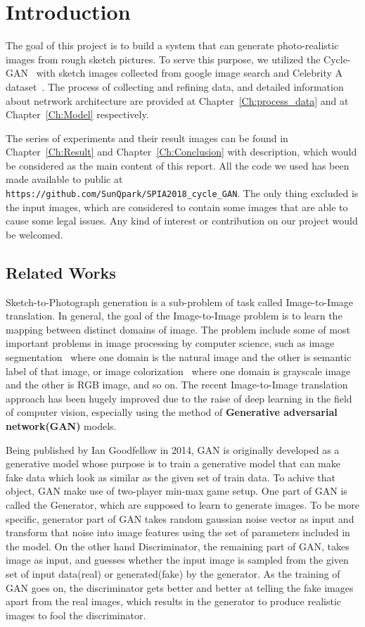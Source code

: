\chapter{Introduction}\label{Ch:Introduction}

The goal of this project is to build a system that can generate photo-realistic images from rough sketch pictures. To serve this purpose, we utilized the Cycle-GAN~\cite{CycleGAN} with sketch images collected from google image search and Celebrity A dataset~\cite{liu2015faceattributes}. The process of collecting and refining data, and detailed information about netrwork architecture are provided at Chapter~\ref{Ch:process_data} and at Chapter~\ref{Ch:Model} respectively. 

The series of experiments and their result images can be found in Chapter~\ref{Ch:Result} and Chapter~\ref{Ch:Conclusion} with description, which would be considered as the main content of this report. All the code we used has been made available to public at \texttt{https://github.com/SunQpark/SPIA2018\_cycle\_GAN}. The only thing excluded is the input images, which are considered to contain some images that are able to cause some legal issues. Any kind of interest or contribution on our project would be welcomed.

\section{Related Works}

Sketch-to-Photograph generation is a sub-problem of task called Image-to-Image translation. In general, the goal of the Image-to-Image problem is to learn the mapping between distinct domains of image. The problem include some of most important problems in image processing by computer science, such as image segmentation~\cite{FCN} where one domain is the natural image and the other is semantic label of that image, or image colorization~\cite{colorization} where one domain is grayscale image and the other is RGB image, and so on. The recent Image-to-Image translation approach has been hugely improved due to the raise of deep learning in the field of computer vision, especially using the method of \textbf{Generative adversarial network(GAN)} models.

Being published by Ian Goodfellow in 2014, GAN is originally developed as a generative model whose purpose is to train a generative model that can make fake data which look as similar as the given set of train data. To achive that object, GAN make use of two-player min-max game setup. One part of GAN is called the Generator, which are supposed to learn to generate images. To be more specific, generator part of GAN takes random gaussian noise vector as input and transform that noise into image features using the set of parameters included in the model. On the other hand Discriminator, the remaining part of GAN, takes image as input, and guesses whether the input image is sampled from the given set of input data(real) or generated(fake) by the generator. As the training of GAN goes on, the discriminator gets better and better at telling the fake images apart from the real images, which results in the generator to produce realistic images to fool the discriminator.

